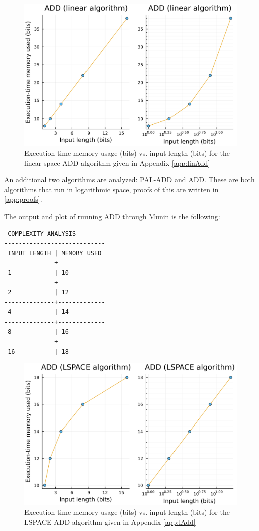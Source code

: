 \documentclass[11pt, a4paper]{article}
\begin{document}
\begin{figure}[H]
    \centering
    \includegraphics[width=\columnwidth]{ADD-(linear-algorithm).png}
    \caption{Execution-time memory usage (bits) vs. input length (bits) for the linear space ADD algorithm given in Appendix \ref{app:linAdd}}
    \label{fig:linAdd}
\end{figure}

An additional two algorithms are analyzed: PAL-ADD and ADD.
These are both algorithms that run in logarithmic space, proofs of this are written in \ref{app:proofs}.

The output and plot of running ADD through Munin is the following:

\begin{lstlisting}
 COMPLEXITY ANALYSIS
----------------------------
 INPUT LENGTH | MEMORY USED 
--------------+-------------
 1            | 10      
--------------+-------------
 2            | 12      
--------------+-------------
 4            | 14      
--------------+-------------
 8            | 16      
--------------+-------------
 16           | 18      
\end{lstlisting}

\begin{figure}[H]
    \centering
    \includegraphics[width=\columnwidth]{ADD-(LSPACE-algorithm).png}
    \caption{Execution-time memory usage (bits) vs. input length (bits) for the LSPACE ADD algorithm given in Appendix \ref{app:lAdd}}
    \label{fig:lAdd}
\end{figure}
\end{document}
